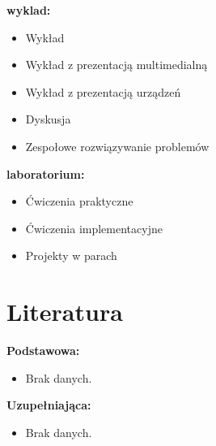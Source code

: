 \documentclass[12pt, a4paper]{article}
\begin{document}
\textbf{wyklad:}
\begin{itemize}
  \item Wykład
  \item Wykład z prezentacją multimedialną
  \item Wykład z prezentacją urządzeń
  \item Dyskusja
  \item Zespołowe rozwiązywanie problemów
\end{itemize}
\vspace{4pt}
\textbf{laboratorium:}
\begin{itemize}
  \item Ćwiczenia praktyczne
  \item Ćwiczenia implementacyjne
  \item Projekty w parach
\end{itemize}
\vspace{4pt}


\section{Literatura}

\textbf{Podstawowa:}
\begin{itemize}
  \item Brak danych.
\end{itemize}

\textbf{Uzupełniająca:}
\begin{itemize}
  \item Brak danych.
\end{itemize}
\end{document}
